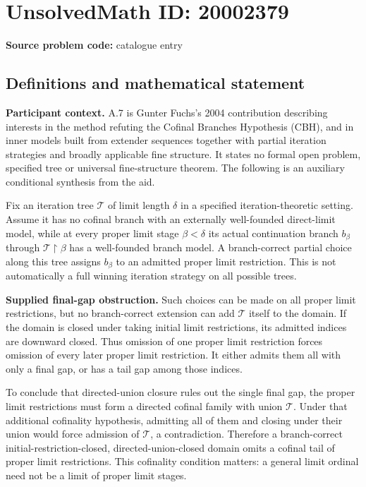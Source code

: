 \documentclass[11pt]{article}
\begin{document}
\section*{UnsolvedMath ID: 20002379}
\textbf{Source problem code:} catalogue entry
\subsection{Definitions and mathematical statement}
\textbf{Participant context.} A.7 is Gunter Fuchs's 2004 contribution describing interests in the method refuting the Cofinal Branches Hypothesis (CBH), and in inner models built from extender sequences together with partial iteration strategies and broadly applicable fine structure. It states no formal open problem, specified tree or universal fine-structure theorem. The following is an auxiliary conditional synthesis from the aid.

Fix an iteration tree $\mathcal T$ of limit length $\delta$ in a specified iteration-theoretic setting. Assume it has no cofinal branch with an externally well-founded direct-limit model, while at every proper limit stage $\beta<\delta$ its actual continuation branch $b_\beta$ through $\mathcal T\restriction\beta$ has a well-founded branch model. A branch-correct partial choice along this tree assigns $b_\beta$ to an admitted proper limit restriction. This is not automatically a full winning iteration strategy on all possible trees.

\textbf{Supplied final-gap obstruction.} Such choices can be made on all proper limit restrictions, but no branch-correct extension can add $\mathcal T$ itself to the domain. If the domain is closed under taking initial limit restrictions, its admitted indices are downward closed. Thus omission of one proper limit restriction forces omission of every later proper limit restriction. It either admits them all with only a final gap, or has a tail gap among those indices.

To conclude that directed-union closure rules out the single final gap, the proper limit restrictions must form a directed cofinal family with union $\mathcal T$. Under that additional cofinality hypothesis, admitting all of them and closing under their union would force admission of $\mathcal T$, a contradiction. Therefore a branch-correct initial-restriction-closed, directed-union-closed domain omits a cofinal tail of proper limit restrictions. This cofinality condition matters: a general limit ordinal need not be a limit of proper limit stages.
\end{document}
